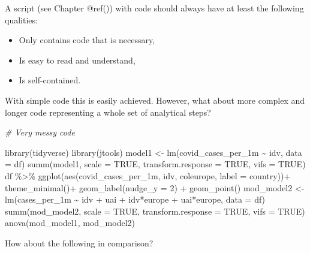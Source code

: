 \documentclass[
]{book}
\newenvironment{Shaded}{\begin{snugshade}}{\end{snugshade}}
\newcommand{\AttributeTok}[1]{\textcolor[rgb]{0.77,0.63,0.00}{#1}}
\newcommand{\CommentTok}[1]{\textcolor[rgb]{0.56,0.35,0.01}{\textit{#1}}}
\newcommand{\ConstantTok}[1]{\textcolor[rgb]{0.00,0.00,0.00}{#1}}
\newcommand{\DecValTok}[1]{\textcolor[rgb]{0.00,0.00,0.81}{#1}}
\newcommand{\FunctionTok}[1]{\textcolor[rgb]{0.00,0.00,0.00}{#1}}
\newcommand{\NormalTok}[1]{#1}
\newcommand{\OtherTok}[1]{\textcolor[rgb]{0.56,0.35,0.01}{#1}}
\newcommand{\SpecialCharTok}[1]{\textcolor[rgb]{0.00,0.00,0.00}{#1}}
\begin{document}
A script (see Chapter @ref()) with code should always have at least the following qualities:

\begin{itemize}
\item
  Only contains code that is necessary,
\item
  Is easy to read and understand,
\item
  Is self-contained.
\end{itemize}

With simple code this is easily achieved. However, what about more complex and longer code representing a whole set of analytical steps?

\begin{Shaded}
\begin{Highlighting}[]
\CommentTok{\# Very messy code}

\FunctionTok{library}\NormalTok{(tidyverse)}
\FunctionTok{library}\NormalTok{(jtools)}
\NormalTok{model1 }\OtherTok{\textless{}{-}} \FunctionTok{lm}\NormalTok{(covid\_cases\_per\_1m }\SpecialCharTok{\textasciitilde{}}\NormalTok{ idv, }\AttributeTok{data =}\NormalTok{ df)}
\FunctionTok{summ}\NormalTok{(model1, }\AttributeTok{scale =} \ConstantTok{TRUE}\NormalTok{, }\AttributeTok{transform.response =} \ConstantTok{TRUE}\NormalTok{, }\AttributeTok{vifs =} \ConstantTok{TRUE}\NormalTok{)}
\NormalTok{df }\SpecialCharTok{\%\textgreater{}\%} \FunctionTok{ggplot}\NormalTok{(}\FunctionTok{aes}\NormalTok{(covid\_cases\_per\_1m, idv, coleurope, }\AttributeTok{label =}\NormalTok{ country))}\SpecialCharTok{+}
\FunctionTok{theme\_minimal}\NormalTok{()}\SpecialCharTok{+} \FunctionTok{geom\_label}\NormalTok{(}\AttributeTok{nudge\_y =} \DecValTok{2}\NormalTok{) }\SpecialCharTok{+} \FunctionTok{geom\_point}\NormalTok{()}
\NormalTok{mod\_model2 }\OtherTok{\textless{}{-}} \FunctionTok{lm}\NormalTok{(cases\_per\_1m }\SpecialCharTok{\textasciitilde{}}\NormalTok{ idv }\SpecialCharTok{+}\NormalTok{ uai }\SpecialCharTok{+}\NormalTok{ idv}\SpecialCharTok{*}\NormalTok{europe }\SpecialCharTok{+}\NormalTok{ uai}\SpecialCharTok{*}\NormalTok{europe, }\AttributeTok{data =}\NormalTok{ df)}
\FunctionTok{summ}\NormalTok{(mod\_model2, }\AttributeTok{scale =} \ConstantTok{TRUE}\NormalTok{, }\AttributeTok{transform.response =} \ConstantTok{TRUE}\NormalTok{, }\AttributeTok{vifs =} \ConstantTok{TRUE}\NormalTok{)}
\FunctionTok{anova}\NormalTok{(mod\_model1, mod\_model2)}
\end{Highlighting}
\end{Shaded}

How about the following in comparison?
\end{document}
